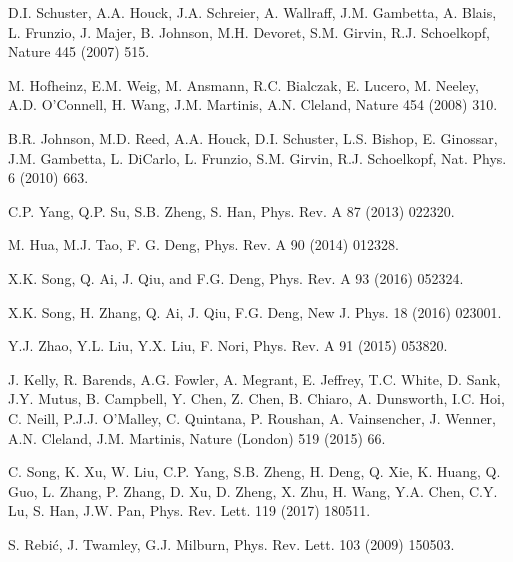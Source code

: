 \documentclass[preprintnumbers,showkeys,amsmath,amssymb]{revtex4}%
\begin{document}
\begin{thebibliography}{1}

 D.I. Schuster, A.A. Houck, J.A. Schreier, A. Wallraff, J.M. Gambetta, A. Blais, L. Frunzio, J. Majer, B. Johnson, M.H. Devoret, S.M. Girvin, R.J. Schoelkopf, Nature 445 (2007) 515.




 M. Hofheinz, E.M. Weig, M. Ansmann, R.C. Bialczak, E. Lucero, M. Neeley, A.D. O'Connell, H. Wang, J.M. Martinis, A.N. Cleland, Nature 454 (2008) 310.

 B.R. Johnson, M.D. Reed, A.A. Houck, D.I. Schuster, L.S. Bishop, E. Ginossar, J.M. Gambetta, L. DiCarlo, L. Frunzio, S.M. Girvin, R.J. Schoelkopf, Nat. Phys. 6 (2010) 663.

 C.P. Yang, Q.P. Su, S.B. Zheng, S. Han, Phys. Rev. A 87 (2013) 022320.

 M. Hua,  M.J. Tao, F. G. Deng, Phys. Rev. A 90 (2014) 012328.

 X.K. Song, Q. Ai, J. Qiu, and F.G. Deng, Phys. Rev. A 93  (2016)
052324.

 X.K. Song, H. Zhang, Q. Ai, J. Qiu,  F.G. Deng, New J. Phys. 18 (2016)
023001.


 Y.J. Zhao, Y.L. Liu, Y.X. Liu, F. Nori, Phys. Rev. A 91 (2015) 053820.

 J. Kelly, R. Barends, A.G. Fowler, A. Megrant, E. Jeffrey, T.C. White, D. Sank, J.Y. Mutus, B. Campbell, Y. Chen, Z. Chen, B. Chiaro, A. Dunsworth, I.C. Hoi, C. Neill, P.J.J. O'Malley, C. Quintana, P. Roushan, A. Vainsencher, J. Wenner, A.N. Cleland, J.M. Martinis, Nature (London) 519 (2015) 66.

 C. Song, K. Xu, W. Liu, C.P. Yang, S.B. Zheng, H. Deng, Q. Xie, K. Huang, Q. Guo, L. Zhang, P. Zhang, D. Xu, D. Zheng, X. Zhu, H. Wang, Y.A. Chen, C.Y. Lu, S. Han, J.W. Pan, Phys. Rev. Lett. 119 (2017) 180511.


 S. Rebi\'{c}, J. Twamley, G.J. Milburn, Phys. Rev. Lett. 103 (2009) 150503.


\end{thebibliography}
\end{document}
